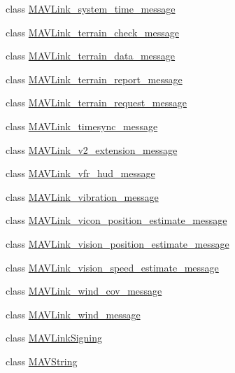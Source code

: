 \begin{DoxyCompactItemize}
\item 
class \hyperlink{classpymavlink_1_1dialects_1_1v10_1_1MAVLink__system__time__message}{M\+A\+V\+Link\+\_\+system\+\_\+time\+\_\+message}
\item 
class \hyperlink{classpymavlink_1_1dialects_1_1v10_1_1MAVLink__terrain__check__message}{M\+A\+V\+Link\+\_\+terrain\+\_\+check\+\_\+message}
\item 
class \hyperlink{classpymavlink_1_1dialects_1_1v10_1_1MAVLink__terrain__data__message}{M\+A\+V\+Link\+\_\+terrain\+\_\+data\+\_\+message}
\item 
class \hyperlink{classpymavlink_1_1dialects_1_1v10_1_1MAVLink__terrain__report__message}{M\+A\+V\+Link\+\_\+terrain\+\_\+report\+\_\+message}
\item 
class \hyperlink{classpymavlink_1_1dialects_1_1v10_1_1MAVLink__terrain__request__message}{M\+A\+V\+Link\+\_\+terrain\+\_\+request\+\_\+message}
\item 
class \hyperlink{classpymavlink_1_1dialects_1_1v10_1_1MAVLink__timesync__message}{M\+A\+V\+Link\+\_\+timesync\+\_\+message}
\item 
class \hyperlink{classpymavlink_1_1dialects_1_1v10_1_1MAVLink__v2__extension__message}{M\+A\+V\+Link\+\_\+v2\+\_\+extension\+\_\+message}
\item 
class \hyperlink{classpymavlink_1_1dialects_1_1v10_1_1MAVLink__vfr__hud__message}{M\+A\+V\+Link\+\_\+vfr\+\_\+hud\+\_\+message}
\item 
class \hyperlink{classpymavlink_1_1dialects_1_1v10_1_1MAVLink__vibration__message}{M\+A\+V\+Link\+\_\+vibration\+\_\+message}
\item 
class \hyperlink{classpymavlink_1_1dialects_1_1v10_1_1MAVLink__vicon__position__estimate__message}{M\+A\+V\+Link\+\_\+vicon\+\_\+position\+\_\+estimate\+\_\+message}
\item 
class \hyperlink{classpymavlink_1_1dialects_1_1v10_1_1MAVLink__vision__position__estimate__message}{M\+A\+V\+Link\+\_\+vision\+\_\+position\+\_\+estimate\+\_\+message}
\item 
class \hyperlink{classpymavlink_1_1dialects_1_1v10_1_1MAVLink__vision__speed__estimate__message}{M\+A\+V\+Link\+\_\+vision\+\_\+speed\+\_\+estimate\+\_\+message}
\item 
class \hyperlink{classpymavlink_1_1dialects_1_1v10_1_1MAVLink__wind__cov__message}{M\+A\+V\+Link\+\_\+wind\+\_\+cov\+\_\+message}
\item 
class \hyperlink{classpymavlink_1_1dialects_1_1v10_1_1MAVLink__wind__message}{M\+A\+V\+Link\+\_\+wind\+\_\+message}
\item 
class \hyperlink{classpymavlink_1_1dialects_1_1v10_1_1MAVLinkSigning}{M\+A\+V\+Link\+Signing}
\item 
class \hyperlink{classpymavlink_1_1dialects_1_1v10_1_1MAVString}{M\+A\+V\+String}
\end{DoxyCompactItemize}
